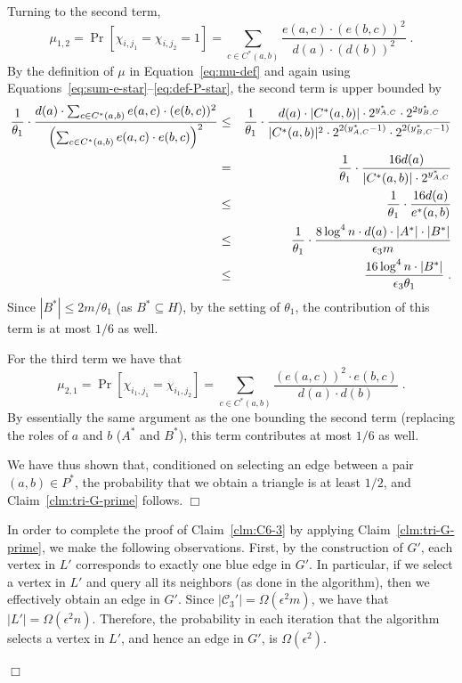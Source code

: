 \documentclass{article}
\newcommand{\eps}{\epsilon}
\newcommand{\calC}{{\mathcal{C}}}
\newenvironment{proof}{\smallskip\noindent{\bf Proof:}}%
        {\hspace*{\fill}$\Box$\par}
\begin{document}
\begin{proof}
\begin{proof}
Turning to the second term, 
\begin{equation}
\mu_{1,2} = 
\Pr[\chi_{i,j_1}=\chi_{i,j_2}=1] 
  = \sum_{c\in C^*(a,b)} \frac{e(a,c)\cdot (e(b,c))^2}{d(a)\cdot (d(b))^2}\;.
\end{equation}
By the definition of $\mu$ in Equation~\eqref{eq:mu-def}
and again using Equations~\eqref{eq:sum-e-star}--\eqref{eq:def-P-star}, the second term is upper bounded by
\begin{eqnarray}
\frac{1}{\theta_1}\cdot \frac{d(a)\cdot \sum_{c\in C^*(a,b)} e(a,c)\cdot (e(b,c))^2 }
                           {\left( \sum_{c\in C^*(a,b)} e(a,c)\cdot e(b,c)\right)^2}  &\leq&
\frac{1}{\theta_1}\cdot \frac{d(a) \cdot |C^*(a,b)| \cdot 2^{y^*_{\tiny A,C}}\cdot 2^{2y^*_{\tiny B,C}}} 
                           {|C^*(a,b)|^2 \cdot 2^{2(y^*_{\tiny A,C}-1)}\cdot 2^{2(y^*_{\tiny B,C}-1)}} \\
 &=&      
 \frac{1}{\theta_1}\cdot \frac{ 16d(a) }
                           {|C^*(a,b)| \cdot 2^{y^*_{\tiny A,C}}} \\   
 &\leq&  \frac{1}{\theta_1}\cdot \frac{16 d(a) }{e^*(a,b)}       \\
 &\leq&    \frac{1}{\theta_1}\cdot \frac{8 \log^4 n \cdot d(a) \cdot |A^{*}|\cdot |B^{*}|}{\eps_3 m }   \\
 &\leq& \frac{16 \log^4 n \cdot |B^{*}|}{\eps_3 \theta_1}  \;.
\end{eqnarray}
Since $|B^*| \leq 2m/\theta_1$ (as $B^* \subseteq H$), by the setting of $\theta_1$, the contribution of this term is at most $1/6$ as well.

For the third term we have that 
\begin{equation}\label{eq:cheb-C6-case3}
\mu_{2,1} = 
  \Pr[\chi_{i_1,j_1}=\chi_{i_1,j_2}] = 
   \sum_{c\in C^*(a,b)} \frac{(e(a,c))^2\cdot e(b,c)}{d(a)\cdot d(b)}\;.
\end{equation}
By essentially the same argument as the one bounding the second term (replacing the roles of $a$ and $b$ ($A^*$ and $B^*$), this term contributes at most $1/6$ as well. 

We have thus shown that, conditioned on selecting an edge between a pair $(a,b) \in P^*$, the probability that we obtain a triangle is at least $1/2$, and Claim~\ref{clm:tri-G-prime} follows.
\end{proof}

\medskip
In order to complete the proof of
Claim~\ref{clm:C6-3} by applying Claim~\ref{clm:tri-G-prime}, we make the following observations. First, by the construction of $G'$, each vertex in $L'$  corresponds to exactly one blue edge in $G'$. In particular, if  we select a vertex in $L'$ and query all its neighbors (as done in the algorithm), then we effectively obtain an edge in $G'$. Since $|\calC_3'|= \Omega(\eps^2 m)$, we have that $|L'| = \Omega(\eps^2 n)$.
Therefore, the probability in each iteration that the algorithm selects a vertex in $L'$, and hence an edge in $G'$, is $\Omega(\eps^2)$. 


\end{proof}
\end{document}

